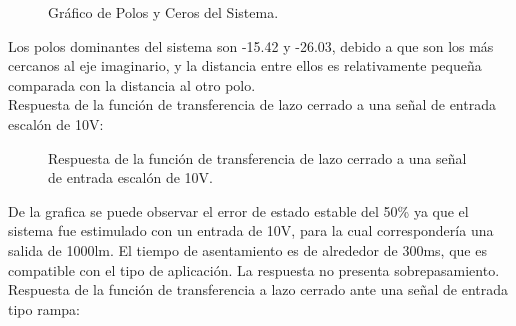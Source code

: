 \documentclass[a4paper,11pt]{article}
\begin{document}
  \begin{figure}[H] %
	\caption{Gráfico de Polos y Ceros del Sistema.}
	\label{fig:cp2}
	\end{figure} 
	
Los polos dominantes del sistema son -15.42 y -26.03, debido a que son los más cercanos al eje imaginario, y la distancia entre ellos es relativamente pequeña comparada con la distancia al otro polo.\\
Respuesta de la función de transferencia de lazo cerrado a una señal de entrada escalón de 10V:

  \begin{figure}[H] %
	\caption{Respuesta de la función de transferencia de lazo cerrado a una señal de entrada escalón de 10V.}
	\label{fig:resp_esc2}
	\end{figure} 

De la grafica se puede observar el error de estado estable del 50\% ya que el sistema fue estimulado con un entrada de 10V, para la cual correspondería una salida de 1000lm. El tiempo de asentamiento es de alrededor de 300ms, que es compatible con el tipo de aplicación. La respuesta no presenta sobrepasamiento.\\
Respuesta de la función de transferencia a lazo cerrado ante una señal de entrada tipo rampa:
\end{document}
